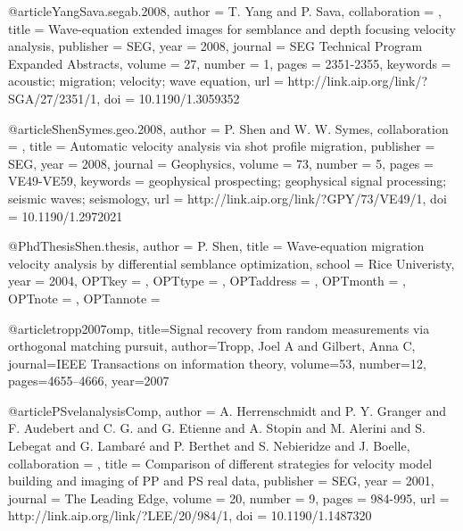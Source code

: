 @article{YangSava.segab.2008,
author = {T. Yang and P. Sava},
collaboration = {},
title = {Wave-equation extended images for semblance and depth focusing velocity analysis},
publisher = {SEG},
year = {2008},
journal = {SEG Technical Program Expanded Abstracts},
volume = {27},
number = {1},
pages = {2351-2355},
keywords = {acoustic; migration; velocity; wave equation},
url = {http://link.aip.org/link/?SGA/27/2351/1},
doi = {10.1190/1.3059352}
}



@article{ShenSymes.geo.2008,
author = {P. Shen and W. W. Symes},
collaboration = {},
title = {Automatic velocity analysis via shot profile migration},
publisher = {SEG},
year = {2008},
journal = {Geophysics},
volume = {73},
number = {5},
pages = {VE49-VE59},
keywords = {geophysical prospecting; geophysical signal processing; seismic waves; seismology},
url = {http://link.aip.org/link/?GPY/73/VE49/1},
doi = {10.1190/1.2972021}
}






@PhdThesis{Shen.thesis,
  author = 	 {P. Shen},
  title = 	 {Wave-equation migration velocity analysis by
                  differential semblance optimization},
  school = 	 {Rice Univeristy},
  year = 	 {2004},
  OPTkey = 	 {},
  OPTtype = 	 {},
  OPTaddress = 	 {},
  OPTmonth = 	 {},
  OPTnote = 	 {},
  OPTannote = 	 {}
}

@article{tropp2007omp,
  title={Signal recovery from random measurements via orthogonal matching pursuit},
  author={Tropp, Joel A and Gilbert, Anna C},
  journal={IEEE Transactions on information theory},
  volume={53},
  number={12},
  pages={4655--4666},
  year={2007}
}


@article{PSvelanalysisComp,
author = {A. Herrenschmidt and P. Y. Granger and
                  F. Audebert and C. G. and
                  G. Etienne and A. Stopin and M.
                  Alerini and S. Lebegat and G. Lambar\'{e}
                  and P. Berthet and S. Nebieridze and
                  J. Boelle},
collaboration = {},
title = {Comparison of different strategies for velocity model
                  building and imaging of {PP} and {PS} real data},
publisher = {SEG},
year = {2001},
journal = {The Leading Edge},
volume = {20},
number = {9},
pages = {984-995},
url = {http://link.aip.org/link/?LEE/20/984/1},
doi = {10.1190/1.1487320}
}









